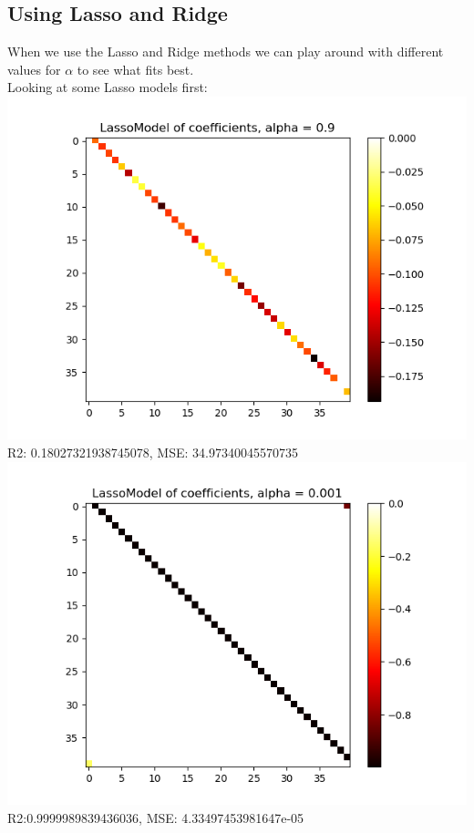 \documentclass[a4paper,norsk]{article}
\begin{document}
\subsection{Using Lasso and Ridge}
When we use the Lasso and Ridge methods we can play around with different values for $\alpha$ to see what fits best.\\
Looking at some Lasso models first:\\
\includegraphics[scale=.7]{images/Lassocoef09}\\
R2: 0.18027321938745078, MSE: 34.97340045570735\\
\includegraphics[scale=.7]{images/Lassocoef0001}\\
R2:0.9999989839436036, MSE: 4.33497453981647e-05\\
\end{document}
